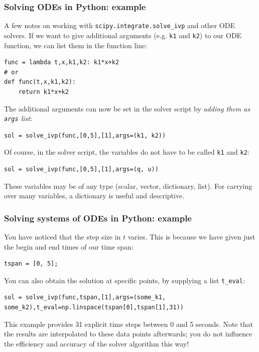 \begin{frame}[label=ode_pass_arguments,fragile]
  \frametitle{Solving ODEs in Python: example}
  A few notes on working with \lstinline$scipy.integrate.solve_ivp$ and other ODE solvers. If we want to give additional arguments (e.g. \lstinline$k1$ and \lstinline$k2$) to our ODE function, we can list them in the function line:
  \begin{lstlisting}
func = lambda t,x,k1,k2: k1*x+k2
# or
def func(t,x,k1,k2):
    return k1*x+k2
  \end{lstlisting}
  The additional arguments can now be set in the solver script by \emph{adding them as \lstinline$args$ list}:
  \begin{lstlisting}
sol = solve_ivp(func,[0,5],[1],args=(k1, k2))
    \end{lstlisting}
  \pause
   Of course, in the solver script, the variables do not have to be called \lstinline$k1$ and \lstinline$k2$:
      \begin{lstlisting}
sol = solve_ivp(func,[0,5],[1],args=(q, u))
    \end{lstlisting}
   These variables may be of any type (scalar, vector, dictionary, list). For carrying over many variables, a dictionary is useful and descriptive.
\end{frame}

\begin{frame}[fragile]
  \frametitle{Solving systems of ODEs in Python: example}
  You have noticed that the step size in $t$ varies. This is because we have given just the begin and end times of our time span:
  \begin{lstlisting}
tspan = [0, 5];
  \end{lstlisting}
  \pause
  You can also obtain the solution at specific points, by supplying a list \lstinline$t_eval$:
  \begin{lstlisting}
sol = solve_ivp(func,tspan,[1],args=(some_k1, some_k2),t_eval=np.linspace(tspan[0],tspan[1],31))
    \end{lstlisting}
  This example provides 31 explicit time steps between 0 and 5 seconds. Note that the results are interpolated to these data points afterwards; you do not influence the efficiency and accuracy of the solver algorithm this way!
  \vfill
\end{frame}